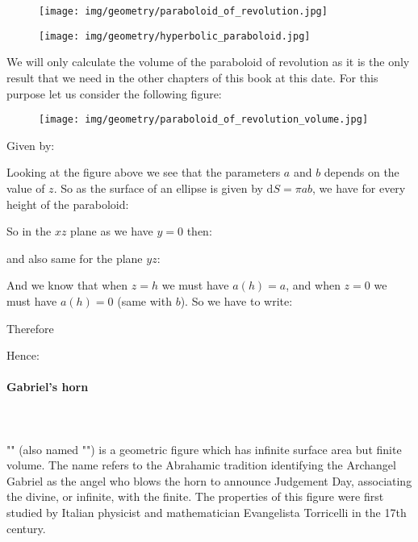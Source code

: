 {	\begin{figure}[H]
		\centering
		\begin{minipage}{.45\linewidth}
		  \texttt{[image: img/geometry/paraboloid\_of\_revolution.jpg]}
		  \label{img1}
		\end{minipage}
		\hspace{.05\linewidth}
		\begin{minipage}{.45\linewidth}
		  \texttt{[image: img/geometry/hyperbolic\_paraboloid.jpg]}
		  \label{img2}
		\end{minipage}
	\end{figure}
	We will only calculate the volume of the paraboloid of revolution as it is the only result that we need in the other chapters of this book at this date. For this purpose let us consider the following figure:
	\begin{figure}[H]
		\centering
		\texttt{[image: img/geometry/paraboloid\_of\_revolution\_volume.jpg]}
	\end{figure}
	Given by:
	
	Looking at the figure above we see that the parameters $a$ and $b$ depends  on the value of $z$. So as the surface of an ellipse is given by $\mathrm{d}S=\pi a b$, we have for every height of the paraboloid:
	
	So in the $xz$ plane as we have $y=0$ then:
	
	and also same for the plane $yz$:
	
	And we know that when $z=h$ we must have $a(h)=a$, and when $z=0$ we must have $a(h)=0$ (same with $b$). So we have to write:
	
	Therefore
	
	Hence:
	
	
	\paragraph{Gabriel's horn}\mbox{}\\\\
	"" (also named "") is a geometric figure which has infinite surface area but finite volume. The name refers to the Abrahamic tradition identifying the Archangel Gabriel as the angel who blows the horn to announce Judgement Day, associating the divine, or infinite, with the finite. The properties of this figure were first studied by Italian physicist and mathematician Evangelista Torricelli in the 17th century.
	
}
